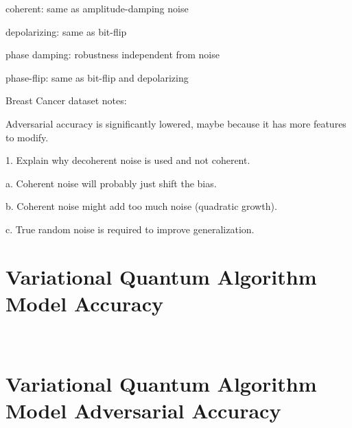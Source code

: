 coherent: same as amplitude-damping noise \

depolarizing:  same as bit-flip \

phase damping: robustness independent from noise \

phase-flip: same as bit-flip and depolarizing \

Breast Cancer dataset notes: \

Adversarial accuracy is significantly lowered, maybe because it has
more features to modify. \


1.	Explain why decoherent noise is used and not coherent. \

  a. Coherent noise will probably just shift the bias. \

  b. Coherent noise might add too much noise (quadratic growth). \

  c. True random noise is required to improve generalization. \


\section{Variational Quantum Algorithm Model Accuracy}\label{section:vqa_accuracy} \


\section{Variational Quantum Algorithm Model Adversarial Accuracy}\label{section:vqa_adversarial_accuracy} \

